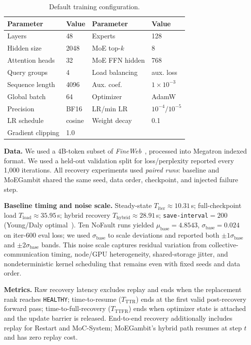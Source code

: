 \documentclass[10pt,conference]{IEEEtran}
\begin{document}
\begin{table}[!b]
\caption{Default training configuration.}
\begin{center}
\footnotesize
\setlength{\tabcolsep}{3pt}
\begin{tabular}{@{}llll@{}}
\toprule
\textbf{Parameter} & \textbf{Value} & \textbf{Parameter} & \textbf{Value} \\
\midrule
Layers & 48 & Experts & 128 \\
Hidden size & 2048 & MoE top-$k$ & 8 \\
Attention heads & 32 & MoE FFN hidden & 768 \\
Query groups & 4 & Load balancing & aux. loss \\
Sequence length & 4096 & Aux. coef. & $1 \times 10^{-3}$ \\
Global batch & 64 & Optimizer & AdamW \\
Precision & BF16 & LR/min LR & $10^{-4}/10^{-5}$ \\
LR schedule & cosine & Weight decay & 0.1 \\
Gradient clipping & 1.0 & & \\
\bottomrule
\end{tabular}
\label{tab:config}
\end{center}
\end{table}

\textbf{Data.} We used a 4B-token subset of \emph{FineWeb}~\cite{penedo2024fineweb}, processed into Megatron indexed format. We used a held-out validation split for loss/perplexity reported every 1{,}000 iterations. All recovery experiments used \emph{paired runs}: baseline and MoEGambit shared the same seed, data order, checkpoint, and injected failure step.

\textbf{Baseline timing and noise scale.} Steady-state $T_{\text{iter}}\!\approx\!10.31$\,s; full-checkpoint load $T_{\text{load}}\!\approx\!35.95$\,s; hybrid recovery $T_{\text{hybrid}}\!\approx\!28.91$\,s; \texttt{save-interval}$=200$ (Young/Daly optimal~\cite{young1974first,daly2006higher}). Ten NoFault runs yielded $\mu_{\text{base}}=4.8543$, $\sigma_{\text{base}}=0.024$ on iter-600 eval loss; we used $\sigma_{\text{base}}$ to scale deviations and reported both $\pm1\sigma_{\text{base}}$ and $\pm2\sigma_{\text{base}}$ bands. This noise scale captures residual variation from collective-communication timing, node/GPU heterogeneity, shared-storage jitter, and nondeterministic kernel scheduling that remains even with fixed seeds and data order.

\textbf{Metrics.} Raw recovery latency excludes replay and ends when the replacement rank reaches \texttt{HEALTHY}; time-to-resume ($T_{\text{TTR}}$) ends at the first valid post-recovery forward pass; time-to-full-recovery ($T_{\text{TTFR}}$) ends when optimizer state is attached and the update barrier is released. End-to-end recovery additionally includes replay for Restart and MoC-System; MoEGambit's hybrid path resumes at step $t$ and has zero replay cost.
\end{document}
